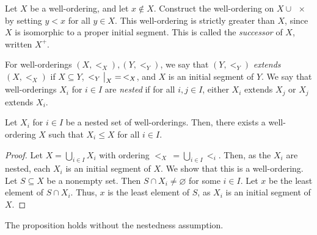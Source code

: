 Let \( X \) be a well-ordering, and let \( x \not\in X \).
Construct the well-ordering on \( X \cup \qty{x} \) by setting \( y < x \) for all \( y \in X \).
This well-ordering is strictly greater than \( X \), since \( X \) is isomorphic to a proper initial segment.
This is called the \emph{successor} of \( X \), written \( X^+ \).

For well-orderings \( (X, <_X), (Y, <_Y) \), we say that \( (Y, <_Y) \) \emph{extends} \( (X, <_X) \) if \( X \subseteq Y \), \( \eval{<_Y}_{X} =\, <_X \), and \( X \) is an initial segment of \( Y \).
We say that well-orderings \( X_i \) for \( i \in I \) are \emph{nested} if for all \( i, j \in I \), either \( X_i \) extends \( X_j \) or \( X_j \) extends \( X_i \).
\begin{proposition}
    Let \( X_i \) for \( i \in I \) be a nested set of well-orderings.
    Then, there exists a well-ordering \( X \) such that \( X_i \leq X \) for all \( i \in I \).
\end{proposition}
\begin{proof}
    Let \( X = \bigcup_{i \in I} X_i \) with ordering \( <_X\, = \bigcup_{i \in I} <_i \).
    Then, as the \( X_i \) are nested, each \( X_i \) is an initial segment of \( X \).
    We show that this is a well-ordering.
    Let \( S \subseteq X \) be a nonempty set.
    Then \( S \cap X_i \neq \varnothing \) for some \( i \in I \).
    Let \( x \) be the least element of \( S \cap X_i \).
    Thus, \( x \) is the least element of \( S \), as \( X_i \) is an initial segment of \( X \).
\end{proof}
\begin{remark}
    The proposition holds without the nestedness assumption.
\end{remark}

